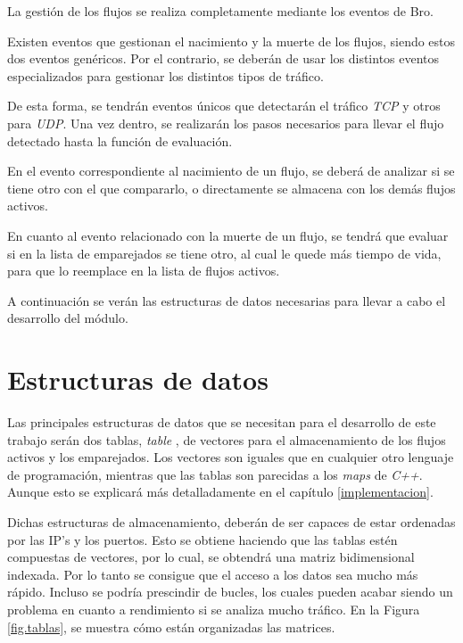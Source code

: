 La gestión de los flujos se realiza completamente mediante los eventos de Bro.

\intro Existen eventos que gestionan el nacimiento y la muerte de los flujos, siendo estos dos eventos genéricos. Por el contrario, 
se deberán de usar los distintos eventos especializados para gestionar los distintos tipos de tráfico.

\intro De esta forma, se tendrán eventos únicos que detectarán el tráfico \textit{TCP} y otros para \textit{UDP}. Una vez dentro, se 
realizarán los pasos necesarios para llevar el flujo detectado hasta la función de evaluación.

\intro En el evento correspondiente al nacimiento de un flujo, se deberá de analizar si se tiene otro con el que compararlo, o directamente se almacena con los demás flujos activos.

\intro En cuanto al evento relacionado con la muerte de un flujo, se tendrá que evaluar si en la lista de emparejados se tiene otro, al cual le quede más tiempo de vida, para que lo reemplace en la lista de flujos activos.

\intro A continuación se verán las estructuras de datos necesarias para llevar a cabo el desarrollo del módulo.

\section{Estructuras de datos}

Las principales estructuras de datos que se necesitan para el desarrollo de este trabajo serán dos tablas, \textit{table} 
\cite{brotable}, de vectores para el almacenamiento de los flujos activos y los emparejados. Los vectores son iguales que en cualquier 
otro lenguaje de programación, mientras que las tablas son parecidas a los \textit{maps} de \textit{C++}. Aunque esto se explicará más 
detalladamente en el capítulo \ref{implementacion}.

\intro Dichas estructuras de almacenamiento, deberán de ser capaces de estar ordenadas por las IP's y los puertos. Esto se obtiene 
haciendo que las tablas estén compuestas de vectores, por lo cual, se obtendrá una matriz bidimensional indexada. Por lo tanto se 
consigue que el acceso a los datos sea mucho más rápido. Incluso se podría prescindir de bucles, los cuales pueden acabar 
siendo un problema en cuanto a rendimiento si se analiza mucho tráfico. En la Figura \ref{fig.tablas}, se muestra cómo están 
organizadas las matrices.

